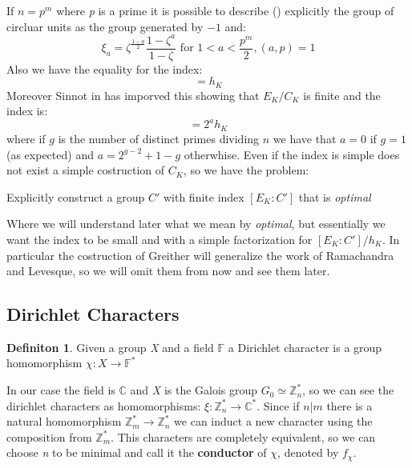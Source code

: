 \documentclass[]{article}
\theoremstyle{plain}
\theoremstyle{remark}
\theoremstyle{definition}
\newtheorem{deff}[teo]{Definiton}
\newcommand{\Z}{\mathbb{Z}}
\newcommand{\F}{\mathbb{F}}
\newcommand{\C} {\mathbb{C}}
\begin{document}
	
	If $ n=p^m $ where \textit{p} is a prime it is possible to describe (\cite[Lemma~8.1, Theorem~8.2]{CF}) explicitly the group of circluar units as the group generated by $ -1 $ and:
	\[
		\xi_a = \zeta^{ \frac{1-a}{2}} \frac{1 - \zeta ^a}{1 - \zeta } \text{ for } 1 < a < \frac{p^m}{2}, (a,p)=1
	\]
	Also we have the equality for the index:
	\begin{equation*}
		[ E_K : C_K ] = h_K
	\end{equation*}
	Moreover Sinnot in \cite{SIN} has imporved this showing that $ E_K / C_K $ is finite and the index is:
	 \begin{equation*}
		 [ E_K : C_K ] = 2^a h_K
	 \end{equation*}
	 where if $ g $ is the number of distinct primes dividing $ n $ we have that $ a=0 $ if $ g=1 $ (as expected) and $ a = 2^{g-2} + 1 - g $ otherwhise. 
	 Even if the index is simple does not exist a simple costruction of $ C_K $, so we have the problem:
	 
	 \begin{tcolorbox}
	 	Explicitly construct a group $ C' $ with finite index $ [ E_K : C' ] $ that is \textit{optimal}
	 \end{tcolorbox}
 
 	Where we will understand later what we mean by \textit{optimal}, but essentially we want the index to be small and with a simple factorization for $ [ E_K : C' ] / h_K $. In particular the costruction of Greither will generalize the work of Ramachandra and Levesque, so we will omit them from now and see them later. 
	 
	\subsection{Dirichlet Characters}
	 
	 \begin{deff}
	 	Given a group \textit{X} and a field $ \F $ a Dirichlet character is a group homomorphism $ \chi :X \to \F ^*  $
	 \end{deff}
	 
	 In our case the field is $ \C $ and \textit{X} is the Galois group $ G_0 \simeq \Z_{n}^*$, so we can see the dirichlet characters as homomorphisms: $ \xi :  \Z_{n}^* \to \C ^* $. Since if $ n | m $ there is a natural homomorphism $ \Z_m^* \to \Z_n^* $ we can induct a new character using the composition from $ \Z_m ^* $. This characters are completely equivalent, so we can choose \textit{n} to be minimal and call it the \textbf{conductor} of $\chi$, denoted by $ f_\chi $. 
	 
\end{document}

